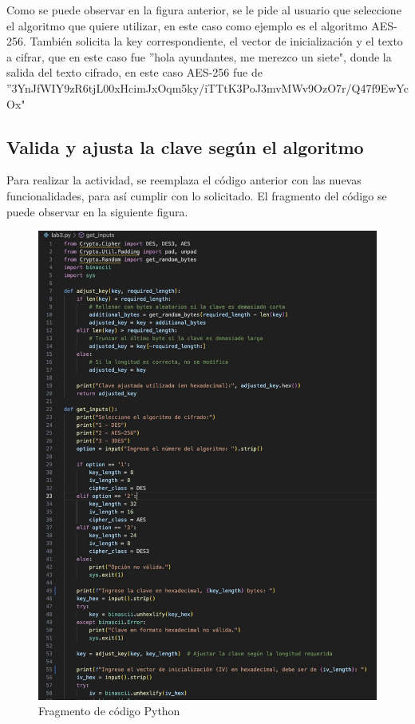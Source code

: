 \documentclass[letter,12pt]{article}
\begin{document}
Como se puede observar en la figura anterior, se le pide al usuario que seleccione el algoritmo que quiere utilizar, en este caso como ejemplo es el algoritmo AES-256. También solicita la key correspondiente, el vector de inicialización y el texto a cifrar, que en este caso fue ''hola ayundantes, me merezco un siete", donde la salida del texto cifrado, en este caso AES-256 fue de ''3YnJfWIY9zR6tjL00xHcimJxOqm5ky/iTTtK3PoJ3mvMWv9OzO7r/Q47f9EwYcOx"  

\subsection{Valida y ajusta la clave según el algoritmo}

Para realizar la actividad, se reemplaza el código anterior con las nuevas funcionalidades, para así cumplir con lo solicitado. El fragmento del código se puede observar en la siguiente figura.

\begin{figure}[H]
    \centering
    \includegraphics[width=0.8\linewidth]{imagenes/codigo 2.jpg}
    \caption{Fragmento de código Python}
    \label{fig:enter-label}
\end{figure}
\end{document}
